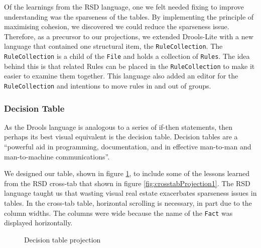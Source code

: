 Of the learnings from the RSD language, one we felt needed fixing to improve understanding was the sparseness of the tables.
By implementing the principle of maximising cohesion, we discovered we could reduce the sparseness issue.
Therefore, as a precursor to our projections, we extended Drools-Lite with a new language that contained one structural item, the \texttt{RuleCollection}.
The \texttt{RuleCollection} is a child of the \texttt{File} and holds a collection of \texttt{Rules}.
The idea behind this is that related Rules can be placed in the \texttt{RuleCollection} to make it easier to examine them together.
This language also added an editor for the \texttt{RuleCollection} and intentions to move rules in and out of groups.

\subsubsection{Decision Table}

As the Drools language is analogous to a series of if-then statements, then perhaps its best visual equivalent is the decision table.
Decision tables are a ``powerful aid in programming, documentation, and in effective man-to-man and man-to-machine communications''\cite{pooch1974translation}.

We designed our table, shown in figure \ref{fig:decisionTableProjection}, to include some of the lessons learned from the RSD cross-tab that shown in figure \ref{fig:crosstabProjection1}.
The RSD language taught us that wasting visual real estate exacerbates sparseness issues in tables.
In the cross-tab table, horizontal scrolling is necessary, in part due to the column widths.
The columns were wide because the name of the \texttt{Fact} was displayed horizontally.

\begin{figure}
    \centering
    \caption{Decision table projection}
    \label{fig:decisionTableProjection}
\end{figure}

